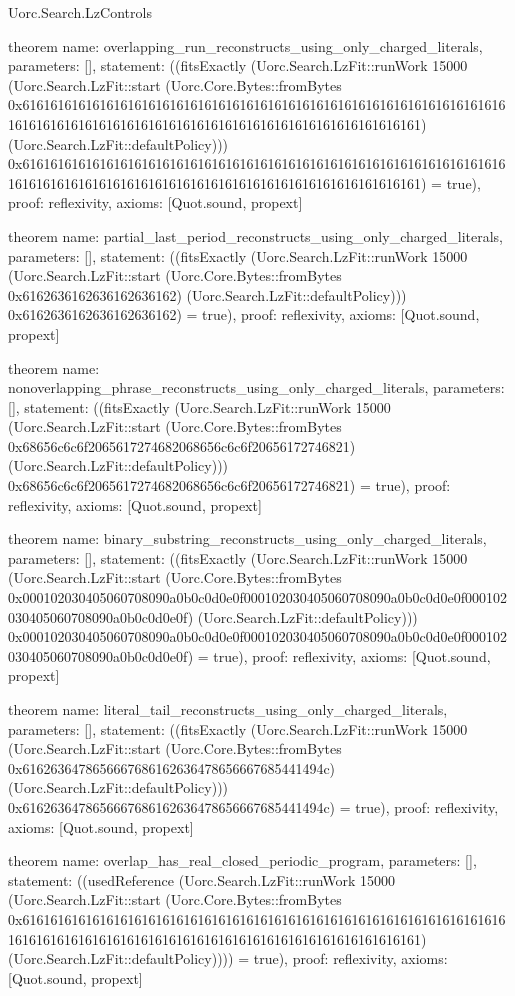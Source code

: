 \begin{lexlean}{Uorc.Search.LzControls}
\begin{semanticmodule}
theorem{
  name: overlapping_run_reconstructs_using_only_charged_literals,
  parameters: [],
  statement: ((fitsExactly (Uorc.Search.LzFit::runWork 15000 (Uorc.Search.LzFit::start (Uorc.Core.Bytes::fromBytes 0x61616161616161616161616161616161616161616161616161616161616161616161616161616161616161616161616161616161616161616161616161616161) (Uorc.Search.LzFit::defaultPolicy))) 0x61616161616161616161616161616161616161616161616161616161616161616161616161616161616161616161616161616161616161616161616161616161) = true),
  proof: reflexivity{},
  axioms: [Quot.sound, propext]
}

theorem{
  name: partial_last_period_reconstructs_using_only_charged_literals,
  parameters: [],
  statement: ((fitsExactly (Uorc.Search.LzFit::runWork 15000 (Uorc.Search.LzFit::start (Uorc.Core.Bytes::fromBytes 0x6162636162636162636162) (Uorc.Search.LzFit::defaultPolicy))) 0x6162636162636162636162) = true),
  proof: reflexivity{},
  axioms: [Quot.sound, propext]
}

theorem{
  name: nonoverlapping_phrase_reconstructs_using_only_charged_literals,
  parameters: [],
  statement: ((fitsExactly (Uorc.Search.LzFit::runWork 15000 (Uorc.Search.LzFit::start (Uorc.Core.Bytes::fromBytes 0x68656c6c6f2065617274682068656c6c6f20656172746821) (Uorc.Search.LzFit::defaultPolicy))) 0x68656c6c6f2065617274682068656c6c6f20656172746821) = true),
  proof: reflexivity{},
  axioms: [Quot.sound, propext]
}

theorem{
  name: binary_substring_reconstructs_using_only_charged_literals,
  parameters: [],
  statement: ((fitsExactly (Uorc.Search.LzFit::runWork 15000 (Uorc.Search.LzFit::start (Uorc.Core.Bytes::fromBytes 0x000102030405060708090a0b0c0d0e0f000102030405060708090a0b0c0d0e0f000102030405060708090a0b0c0d0e0f) (Uorc.Search.LzFit::defaultPolicy))) 0x000102030405060708090a0b0c0d0e0f000102030405060708090a0b0c0d0e0f000102030405060708090a0b0c0d0e0f) = true),
  proof: reflexivity{},
  axioms: [Quot.sound, propext]
}

theorem{
  name: literal_tail_reconstructs_using_only_charged_literals,
  parameters: [],
  statement: ((fitsExactly (Uorc.Search.LzFit::runWork 15000 (Uorc.Search.LzFit::start (Uorc.Core.Bytes::fromBytes 0x6162636478656667686162636478656667685441494c) (Uorc.Search.LzFit::defaultPolicy))) 0x6162636478656667686162636478656667685441494c) = true),
  proof: reflexivity{},
  axioms: [Quot.sound, propext]
}

theorem{
  name: overlap_has_real_closed_periodic_program,
  parameters: [],
  statement: ((usedReference (Uorc.Search.LzFit::runWork 15000 (Uorc.Search.LzFit::start (Uorc.Core.Bytes::fromBytes 0x61616161616161616161616161616161616161616161616161616161616161616161616161616161616161616161616161616161616161616161616161616161) (Uorc.Search.LzFit::defaultPolicy)))) = true),
  proof: reflexivity{},
  axioms: [Quot.sound, propext]
}


\end{semanticmodule}
\end{lexlean}
